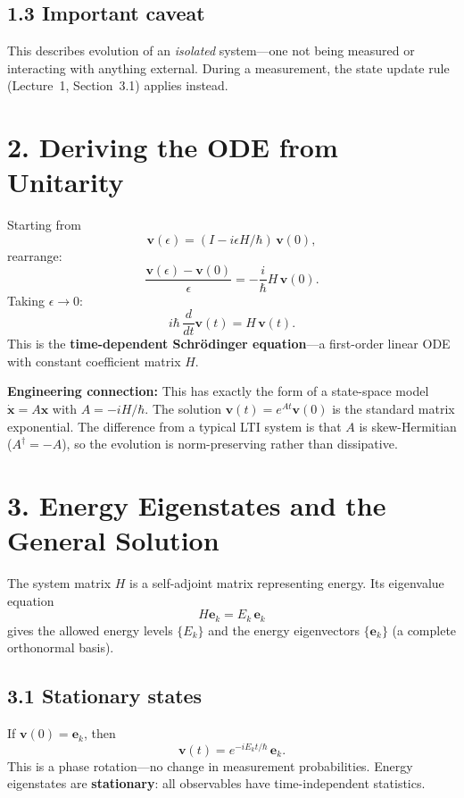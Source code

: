 \documentclass[12pt,a4paper]{article}
\begin{document}
\subsection{1.3 Important caveat}
This describes evolution of an \emph{isolated} system---one not being measured or interacting with anything external.  During a measurement, the state update rule (Lecture~1, Section~3.1) applies instead.

\section{2. Deriving the ODE from Unitarity}

Starting from
\[
    \mathbf{v}(\epsilon) = (I - i\epsilon H/\hbar)\,\mathbf{v}(0),
\]
rearrange:
\[
    \frac{\mathbf{v}(\epsilon)-\mathbf{v}(0)}{\epsilon} = -\frac{i}{\hbar}H\,\mathbf{v}(0).
\]
Taking $\epsilon\to 0$:
\[
    \boxed{i\hbar\,\frac{d}{dt}\mathbf{v}(t) = H\,\mathbf{v}(t).}
\]
This is the \textbf{time-dependent Schr\"{o}dinger equation}---a first-order linear ODE with constant coefficient matrix $H$.

\medskip
\noindent\textbf{Engineering connection:} This has exactly the form of a state-space model $\dot{\mathbf{x}} = A\mathbf{x}$ with $A = -iH/\hbar$.  The solution $\mathbf{v}(t) = e^{At}\mathbf{v}(0)$ is the standard matrix exponential.  The difference from a typical LTI system is that $A$ is skew-Hermitian ($A^\dagger = -A$), so the evolution is norm-preserving rather than dissipative.

\section{3. Energy Eigenstates and the General Solution}

The system matrix $H$ is a self-adjoint matrix representing energy.  Its eigenvalue equation
\[
    \boxed{H\mathbf{e}_k = E_k\,\mathbf{e}_k}
\]
gives the allowed energy levels $\{E_k\}$ and the energy eigenvectors $\{\mathbf{e}_k\}$ (a complete orthonormal basis).

\subsection{3.1 Stationary states}
If $\mathbf{v}(0) = \mathbf{e}_k$, then
\[
    \mathbf{v}(t) = e^{-iE_k t/\hbar}\,\mathbf{e}_k.
\]
This is a phase rotation---no change in measurement probabilities.  Energy eigenstates are \textbf{stationary}: all observables have time-independent statistics.
\end{document}

